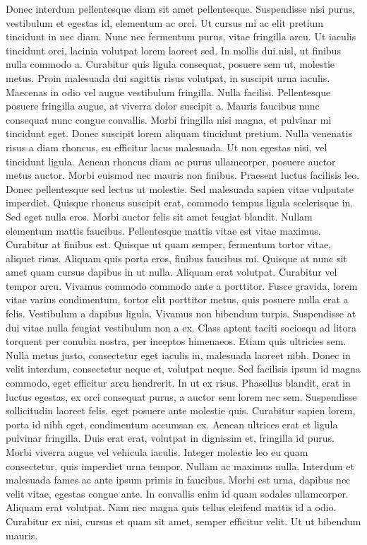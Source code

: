 \documentclass[a4paper,11pt,twoside]{book}
\begin{document}
Donec interdum pellentesque diam sit amet pellentesque. Suspendisse nisi purus, vestibulum et egestas id, elementum ac orci. Ut cursus mi ac elit pretium tincidunt in nec diam. Nunc nec fermentum purus, vitae fringilla arcu. Ut iaculis tincidunt orci, lacinia volutpat lorem laoreet sed. In mollis dui nisl, ut finibus nulla commodo a. Curabitur quis ligula consequat, posuere sem ut, molestie metus. Proin malesuada dui sagittis risus volutpat, in suscipit urna iaculis. Maecenas in odio vel augue vestibulum fringilla. Nulla facilisi.
Pellentesque posuere fringilla augue, at viverra dolor suscipit a. Mauris faucibus nunc consequat nunc congue convallis. Morbi fringilla nisi magna, et pulvinar mi tincidunt eget. Donec suscipit lorem aliquam tincidunt pretium. Nulla venenatis risus a diam rhoncus, eu efficitur lacus malesuada. Ut non egestas nisi, vel tincidunt ligula. Aenean rhoncus diam ac purus ullamcorper, posuere auctor metus auctor. Morbi euismod nec mauris non finibus. Praesent luctus facilisis leo. Donec pellentesque sed lectus ut molestie.
Sed malesuada sapien vitae vulputate imperdiet. Quisque rhoncus suscipit erat, commodo tempus ligula scelerisque in. Sed eget nulla eros. Morbi auctor felis sit amet feugiat blandit. Nullam elementum mattis faucibus. Pellentesque mattis vitae est vitae maximus. Curabitur at finibus est. Quisque ut quam semper, fermentum tortor vitae, aliquet risus. Aliquam quis porta eros, finibus faucibus mi. Quisque at nunc sit amet quam cursus dapibus in ut nulla.
Aliquam erat volutpat. Curabitur vel tempor arcu. Vivamus commodo commodo ante a porttitor. Fusce gravida, lorem vitae varius condimentum, tortor elit porttitor metus, quis posuere nulla erat a felis. Vestibulum a dapibus ligula. Vivamus non bibendum turpis. Suspendisse at dui vitae nulla feugiat vestibulum non a ex. Class aptent taciti sociosqu ad litora torquent per conubia nostra, per inceptos himenaeos. Etiam quis ultricies sem. Nulla metus justo, consectetur eget iaculis in, malesuada laoreet nibh. Donec in velit interdum, consectetur neque et, volutpat neque. Sed facilisis ipsum id magna commodo, eget efficitur arcu hendrerit. In ut ex risus. Phasellus blandit, erat in luctus egestas, ex orci consequat purus, a auctor sem lorem nec sem.
Suspendisse sollicitudin laoreet felis, eget posuere ante molestie quis. Curabitur sapien lorem, porta id nibh eget, condimentum accumsan ex. Aenean ultrices erat et ligula pulvinar fringilla. Duis erat erat, volutpat in dignissim et, fringilla id purus. Morbi viverra augue vel vehicula iaculis. Integer molestie leo eu quam consectetur, quis imperdiet urna tempor. Nullam ac maximus nulla. Interdum et malesuada fames ac ante ipsum primis in faucibus. Morbi est urna, dapibus nec velit vitae, egestas congue ante. In convallis enim id quam sodales ullamcorper. Aliquam erat volutpat. Nam nec magna quis tellus eleifend mattis id a odio. Curabitur ex nisi, cursus et quam sit amet, semper efficitur velit. Ut ut bibendum mauris.
\end{document}
